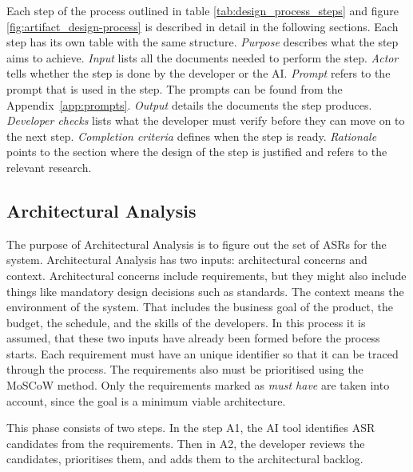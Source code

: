 \FloatBarrier

Each step of the process outlined in table \ref{tab:design_process_steps} and figure \ref{fig:artifact_design-process} is described in detail in the following sections. Each step has its own table with the same structure. \emph{Purpose} describes what the step aims to achieve. \emph{Input} lists all the documents needed to perform the step. \emph{Actor} tells whether the step is done by the developer or the AI. \emph{Prompt} refers to the prompt that is used in the step. The prompts can be found from the Appendix~\ref{app:prompts}. \emph{Output} details the documents the step produces. \emph{Developer checks} lists what the developer must verify before they can move on to the next step. \emph{Completion criteria} defines when the step is ready. \emph{Rationale} points to the section where the design of the step is justified and refers to the relevant research.


\subsection{Architectural Analysis}
\label{sec:architectural_analysis}

The purpose of Architectural Analysis is to figure out the set of ASRs for the system. Architectural Analysis has two inputs: architectural concerns and context. Architectural concerns include requirements, but they might also include things like mandatory design decisions such as standards. The context means the environment of the system. That includes the business goal of the product, the budget, the schedule, and the skills of the developers. In this process it is assumed, that these two inputs have already been formed before the process starts. Each requirement must have an unique identifier so that it can be traced through the process. The requirements also must be prioritised using the MoSCoW method. Only the requirements marked as \emph{must have} are taken into account, since the goal is a minimum viable architecture.

This phase consists of two steps. In the step A1, the AI tool identifies ASR candidates from the requirements. Then in A2, the developer reviews the candidates, prioritises them, and adds them to the architectural backlog.

